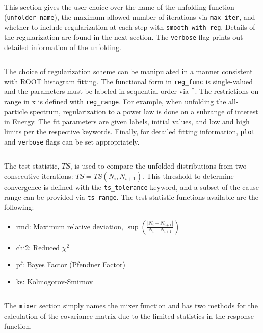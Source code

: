 \noindent\hrulefill

\inputminted[firstline=29,lastline=34]{ini}{config_example.cfg}
This section gives the user choice over the name of the unfolding function (\verb|unfolder_name|), 
the maximum allowed number of iterations via \verb|max_iter|,
and whether to include regularization at each step with \verb|smooth_with_reg|.
Details of the regularization are found in the next section.
The \verb|verbose| flag prints out detailed information of the unfolding.



\noindent\hrulefill

\inputminted[firstline=36,lastline=48]{ini}{config_example.cfg}
The choice of regularization scheme can be manipulated in a manner consistent with ROOT histogram fitting.
The functional form in \verb|reg_func| is single-valued and the parameters must be labeled in sequential order via [].
The restrictions on range in x is defined with \verb|reg_range|. 
For example, when unfolding the all-particle spectrum, regularization to a power law is done on a subrange of interest in Energy.
The fit parameters are given labels, initial values, and low and high limits per the respective keywords.
Finally, for detailed fitting information, \verb|plot| and \verb|verbose| flags can be set appropriately.


\noindent\hrulefill

\inputminted[firstline=50,lastline=57]{ini}{config_example.cfg}
The test statistic, $TS$, is used to compare the unfolded distributions from two consecutive iterations: $TS = TS(N_{i},N_{i+1})$.
This threshold to determine convergence is defined with the \verb|ts_tolerance| keyword,
and a subset of the cause range can be provided via \verb|ts_range|.
The test statistic functions available are the following:

\begin{itemize}
  \item rmd: Maximum relative deviation, $\sup(\frac{|N_{i}-N_{i+1}|}{N_{i}+N_{i+1}})$
  \item chi2: Reduced $\chi^{2}$
  \item pf: Bayes Factor (Pfendner Factor) \cite{pfenderfactor}
  \item ks: Kolmogorov-Smirnov
\end{itemize}


\noindent\hrulefill

\inputminted[firstline=59,lastline=62]{ini}{config_example.cfg}
The \verb|mixer| section simply names the mixer function and has two methods for the calculation 
of the covariance matrix due to the limited statistics in the response function.

